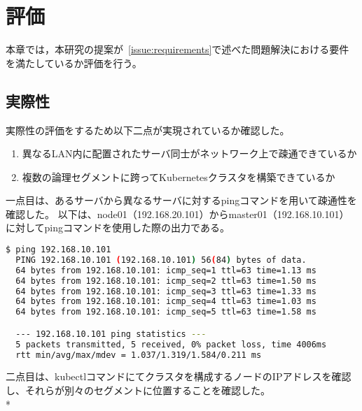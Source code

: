 \chapter{評価}
\label{evaluation}

本章では，本研究の提案が~\ref{issue:requirements}で述べた問題解決における要件を満たしているか評価を行う。

\section{実際性}
\label{evaluation:method}

実際性の評価をするため以下二点が実現されているか確認した。

\begin{enumerate}
  \item 異なるLAN内に配置されたサーバ同士がネットワーク上で疎通できているか
  \item 複数の論理セグメントに跨ってKubernetesクラスタを構築できているか
\end{enumerate}

一点目は、あるサーバから異なるサーバに対するpingコマンドを用いて疎通性を確認した。
以下は、node01（192.168.20.101）からmaster01（192.168.10.101）に対してpingコマンドを使用した際の出力である。

\begin{lstlisting}[language=bash]
  $ ping 192.168.10.101
  PING 192.168.10.101 (192.168.10.101) 56(84) bytes of data.
  64 bytes from 192.168.10.101: icmp_seq=1 ttl=63 time=1.13 ms
  64 bytes from 192.168.10.101: icmp_seq=2 ttl=63 time=1.50 ms
  64 bytes from 192.168.10.101: icmp_seq=3 ttl=63 time=1.33 ms
  64 bytes from 192.168.10.101: icmp_seq=4 ttl=63 time=1.03 ms
  64 bytes from 192.168.10.101: icmp_seq=5 ttl=63 time=1.58 ms

  --- 192.168.10.101 ping statistics ---
  5 packets transmitted, 5 received, 0% packet loss, time 4006ms
  rtt min/avg/max/mdev = 1.037/1.319/1.584/0.211 ms
\end{lstlisting}

二点目は、kubectlコマンドにてクラスタを構成するノードのIPアドレスを確認し、それらが別々のセグメントに位置することを確認した。\\*

